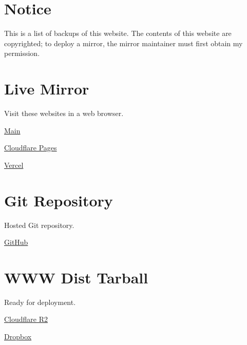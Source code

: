 




\section*{Notice}

This is a list of backups of this website.
The contents of this website are copyrighted; to deploy a mirror, the mirror maintainer must first obtain my permission.

\section*{Live Mirror}

Visit these websites in a web browser.

\begin{compactitem}
    \item \href{https://neruthes.xyz/}{Main}
    \item \href{https://neruthes.pages.dev/}{Cloudflare Pages}
    \item \href{https://neruthes.vercel.app/}{Vercel}
\end{compactitem}

\section*{Git Repository}

Hosted Git repository.

\begin{compactitem}
    \item \href{https://github.com/neruthes/homepage-gen3}{GitHub}
\end{compactitem}

\section*{WWW Dist Tarball}

Ready for deployment.

\begin{compactitem}
    \item \href{https://pub-714f8d634e8f451d9f2fe91a4debfa23.r2.dev/o/wwwdist.tar--00ef643fb4afb6610f3adbbb0ac4fc7c.tar}{Cloudflare R2}
    \item \href{https://www.dropbox.com/s/x7qxeceaaytbkui/wwwdist.tar?dl=0}{Dropbox}
\end{compactitem}

